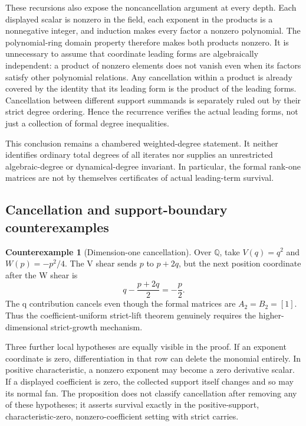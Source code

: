 \documentclass[11pt,letterpaper]{article}
\theoremstyle{definition}
\newtheorem{counterexample}[theorem]{Counterexample}
\theoremstyle{remark}
\numberwithin{equation}{section}
\begin{document}
These recursions also expose the noncancellation argument at every depth.
Each displayed scalar is nonzero in the field, each exponent in the
products is a nonnegative integer, and induction makes every factor a
nonzero polynomial.  The polynomial-ring domain property therefore makes
both products nonzero.  It is unnecessary to assume that coordinate
leading forms are algebraically independent: a product of nonzero elements
does not vanish even when its factors satisfy other polynomial relations.
Any cancellation within a product is already covered by the identity that
its leading form is the product of the leading forms.  Cancellation between
different support summands is separately ruled out by their strict degree
ordering.  Hence the recurrence verifies the actual leading forms, not
just a collection of formal degree inequalities.

This conclusion remains a chambered weighted-degree statement.  It neither
identifies ordinary total degrees of all iterates nor supplies an unrestricted
algebraic-degree or dynamical-degree invariant.  In particular, the formal
rank-one matrices are not by themselves certificates of actual leading-term
survival.

\subsection{Cancellation and support-boundary counterexamples}

\begin{counterexample}[Dimension-one cancellation]
\label{cex:dimension-one}
Over \(\mathbb Q\), take \(V(q)=q^2\) and \(W(p)=-p^2/4\).  The V shear
sends \(p\) to \(p+2q\), but the next position coordinate after the W shear
is
\begin{equation}
 q-\frac{p+2q}{2}=-\frac p2.
 \label{eq:dimension-one-cancellation}
\end{equation}
The q contribution cancels even though the formal matrices are
\(A_2=B_2=[1]\).  Thus the coefficient-uniform strict-lift theorem genuinely
requires the higher-dimensional strict-growth mechanism.
\end{counterexample}

Three further local hypotheses are equally visible in the proof.  If an
exponent coordinate is zero, differentiation in that row can delete the
monomial entirely.  In positive characteristic, a nonzero exponent may
become a zero derivative scalar.  If a displayed coefficient is zero, the
collected support itself changes and so may its normal fan.  The proposition
does not classify cancellation after removing any of these hypotheses; it
asserts survival exactly in the positive-support, characteristic-zero,
nonzero-coefficient setting with strict carries.
\end{document}
